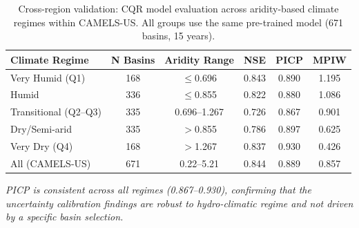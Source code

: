 \begin{table}[h]
\caption{Cross-region validation: CQR model evaluation across aridity-based climate regimes within CAMELS-US. All groups use the same pre-trained model (671 basins, 15 years).}
\label{tab:cross_region}
\begin{tabular}{lccccc}
\hline
Climate Regime & N Basins & Aridity Range & NSE & PICP & MPIW \\
\hline
Very Humid (Q1) & 168 & $\leq$0.696 & 0.843 & 0.890 & 1.195 \\
Humid & 336 & $\leq$0.855 & 0.822 & 0.880 & 1.086 \\
Transitional (Q2--Q3) & 335 & 0.696--1.267 & 0.726 & 0.867 & 0.901 \\
Dry/Semi-arid & 335 & $>$0.855 & 0.786 & 0.897 & 0.625 \\
Very Dry (Q4) & 168 & $>$1.267 & 0.837 & 0.930 & 0.426 \\
\hline
All (CAMELS-US) & 671 & 0.22--5.21 & 0.844 & 0.889 & 0.857 \\
\hline
\end{tabular}
\vspace{2mm}
\footnotesize{\textit{PICP is consistent across all regimes (0.867--0.930), confirming that the uncertainty calibration findings are robust to hydro-climatic regime and not driven by a specific basin selection.}}
\end{table}
